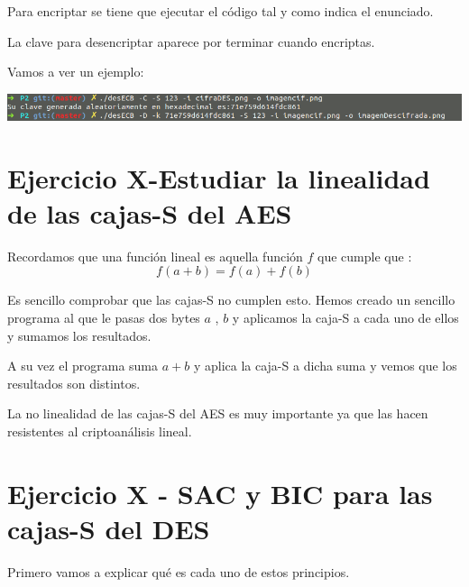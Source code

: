 \documentclass{apuntes}
\begin{document}
Para encriptar se tiene que ejecutar el código tal y como indica el enunciado.

La clave para desencriptar aparece por terminar cuando encriptas.

Vamos a ver un ejemplo:

\begin{center}
		\includegraphics[width=400pt]{EjecutaDES.png}
\end{center}



\section{Ejercicio X-Estudiar la linealidad de las cajas-S del AES}

Recordamos que una función lineal es aquella función $f$ que cumple que :
$$f(a + b) = f(a) + f(b)$$

Es sencillo comprobar que las cajas-S no cumplen esto. Hemos creado un sencillo programa al que le pasas dos bytes $a$ , $b$ y aplicamos la caja-S a cada uno de ellos y sumamos los resultados.

A su vez el programa suma $a + b$ y aplica la caja-S a dicha suma y vemos que los resultados son distintos.

La no linealidad de las cajas-S del AES es muy importante ya que las hacen resistentes al criptoanálisis lineal.

\section{Ejercicio X - SAC y BIC para las cajas-S del DES}

Primero vamos a explicar qué es cada uno de estos principios.
\end{document}
